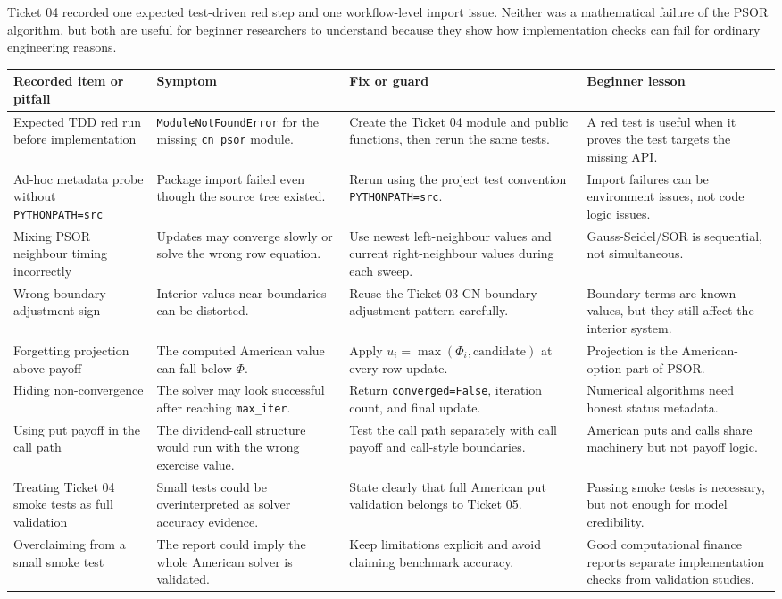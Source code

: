\documentclass[11pt,a4paper]{article}
\newcommand{\code}[1]{\texttt{#1}}
\begin{document}
Ticket 04 recorded one expected test-driven red step and one workflow-level import issue. Neither
was a mathematical failure of the PSOR algorithm, but both are useful for beginner researchers to
understand because they show how implementation checks can fail for ordinary engineering reasons.

\begin{longtable}{L{0.22\textwidth}L{0.24\textwidth}L{0.21\textwidth}L{0.19\textwidth}}
\toprule
Recorded item or pitfall & Symptom & Fix or guard & Beginner lesson \\
\midrule
\endhead
Expected TDD red run before implementation &
\code{ModuleNotFoundError} for the missing \code{cn\_psor} module. &
Create the Ticket 04 module and public functions, then rerun the same tests. &
A red test is useful when it proves the test targets the missing API. \\
Ad-hoc metadata probe without \code{PYTHONPATH=src} &
Package import failed even though the source tree existed. &
Rerun using the project test convention \code{PYTHONPATH=src}. &
Import failures can be environment issues, not code logic issues. \\
Mixing PSOR neighbour timing incorrectly &
Updates may converge slowly or solve the wrong row equation. &
Use newest left-neighbour values and current right-neighbour values during each sweep. &
Gauss-Seidel/SOR is sequential, not simultaneous. \\
Wrong boundary adjustment sign &
Interior values near boundaries can be distorted. &
Reuse the Ticket 03 CN boundary-adjustment pattern carefully. &
Boundary terms are known values, but they still affect the interior system. \\
Forgetting projection above payoff &
The computed American value can fall below \(\Phi\). &
Apply \(u_i=\max(\Phi_i,\text{candidate})\) at every row update. &
Projection is the American-option part of PSOR. \\
Hiding non-convergence &
The solver may look successful after reaching \code{max\_iter}. &
Return \code{converged=False}, iteration count, and final update. &
Numerical algorithms need honest status metadata. \\
Using put payoff in the call path &
The dividend-call structure would run with the wrong exercise value. &
Test the call path separately with call payoff and call-style boundaries. &
American puts and calls share machinery but not payoff logic. \\
Treating Ticket 04 smoke tests as full validation &
Small tests could be overinterpreted as solver accuracy evidence. &
State clearly that full American put validation belongs to Ticket 05. &
Passing smoke tests is necessary, but not enough for model credibility. \\
Overclaiming from a small smoke test &
The report could imply the whole American solver is validated. &
Keep limitations explicit and avoid claiming benchmark accuracy. &
Good computational finance reports separate implementation checks from validation studies. \\
\bottomrule
\end{longtable}
\end{document}
